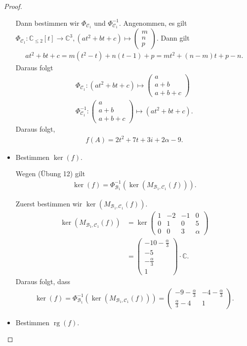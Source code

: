 \documentclass[12pt]{extarticle}
\newcommand{\mg}[1]{\mathbb{#1}}
\newcommand{\mc}[1]{\mathcal{#1}}
\newcommand{\rg}{\operatorname{rg}}
\begin{document}
\begin{proof}
\begin{itemize}
Dann bestimmen wir \(\Phi_{\mc{C}_1}\) und
\(\Phi_{\mc{C}_1}^{-1}\).  Angenommen, es gilt
$\Phi_{\mc{C}_1} \colon \mg{C}_{\le 2}[t] \to \mg{C}^3,
(at^2 + bt + c) \mapsto
\begin{pmatrix}
  m \\
  n \\
  p
\end{pmatrix}$.  Dann gilt
\begin{align*}
at^2 + bt + c = m(t^2 - t) + n(t - 1) + p = mt^2 +
  (n-m)t + p - n.
\end{align*}
Daraus folgt
\begin{align*}
  \Phi_{\mc{C}_1} \colon
   (at^2 + bt + c) \mapsto
\begin{pmatrix}
  a \\
  a + b \\
  a + b + c
\end{pmatrix}\\
\Phi_{\mc{C}_1}^{-1} \colon
\begin{pmatrix}
  a \\
  a + b \\
  a + b + c
\end{pmatrix} \mapsto (at^2 + bt + c).
\end{align*}  Daraus folgt,
\begin{align*}
f(A) = 2t^2 + 7t + 3i + 2\alpha - 9.
\end{align*}
\item Bestimmen \(\ker(f)\).

Wegen (Übung 12) gilt
\begin{align*}
\ker(f) = \Phi_{\mc{B}_1}^{-1}(\ker(M_{\mc{B}_1,\mc{C}_1}(f))).
\end{align*}

Zuerst bestimmen wir \(\ker(M_{\mc{B}_1,\mc{C}_1}(f))\).
\begin{align*}
\ker(M_{\mc{B}_1,\mc{C}_1}(f)) &= \ker
\begin{pmatrix}
  1 & -2 & -1 & 0\\
  0 & 1 & 0 & 5 \\
  0 & 0 & 3 & \alpha
\end{pmatrix}\\
  &=
\begin{pmatrix}
  -10 - \frac{\alpha}{3} \\
  -5 \\
  - \frac{\alpha}{3} \\
  1
\end{pmatrix} \cdot \mg{C}.
\end{align*}
Daraus folgt, dass
\begin{align*}
  \ker(f) =   \Phi_{\mc{B}_1}^{-1}(\ker(M_{\mc{B}_1,\mc{C}_1}(f)))
  =
\begin{pmatrix}
  -9 - \frac{\alpha}{3} & -4 -\frac{\alpha}{3} \\
  \frac{\alpha}{3} - 4 & 1
\end{pmatrix}.
\end{align*}
\item Bestimmen \(\rg(f)\).


\end{itemize}
\end{proof}
\end{document}
